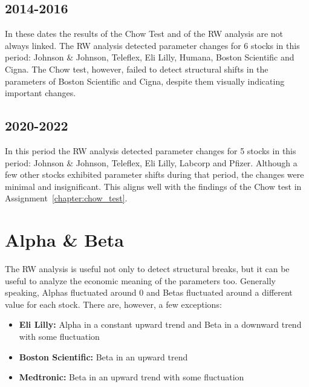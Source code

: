 
\subsection{2014-2016}

In these dates the results of the Chow Test and of the RW analysis are not always linked. 
The RW analysis detected parameter changes for 6 stocks in this period: Johnson \& Johnson, Teleflex, Eli Lilly, Humana,
Boston Scientific and Cigna.
The Chow test, however, failed to detect structural shifts in the parameters of Boston Scientific and Cigna, despite them 
visually indicating important changes.


\subsection{2020-2022}

In this period the RW analysis detected parameter changes for 5 stocks in this period: Johnson \& Johnson, Teleflex, Eli Lilly, 
Labcorp and Pfizer.
Although a few other stocks exhibited parameter shifts during that period, the changes were minimal and insignificant. 
This aligns well with the findings of the Chow test in Assignment~\ref{chapter:chow_test}.

\section{Alpha \& Beta}

The RW analysis is useful not only to detect structural breaks, but it can be useful to analyze the economic meaning of the
parameters too.
Generally speaking, Alphas fluctuated around 0 and Betas fluctuated around a different value for each stock.
There are, however, a few exceptions:
\begin{itemize}
    \item \textbf{Eli Lilly:} Alpha in a constant upward trend and Beta in a downward trend with some fluctuation
    \item \textbf{Boston Scientific:} Beta in an upward trend
    \item \textbf{Medtronic:} Beta in an upward trend with some fluctuation
\end{itemize}

